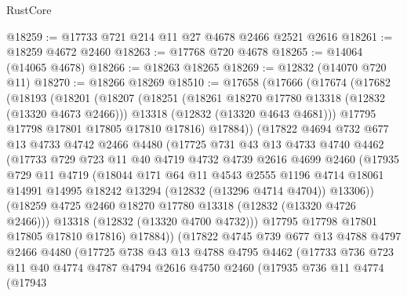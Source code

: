 \begin{lexlean}{RustCore}
\begin{coremodule}
@18259 := @17733 @721 @214 @11 @27 @4678 @2466 @2521 @2616
@18261 := @18259 @4672 @2460
@18263 := @17768 @720 @4678
@18265 := @14064 (@14065 @4678)
@18266 := @18263 @18265
@18269 := @12832 (@14070 @720 @11)
@18270 := @18266 @18269
@18510 := @17658
    (@17666
      (@17674
        (@17682
          (@18193
            (@18201
              (@18207
                (@18251
                  (@18261 @18270 @17780 @13318 (@12832 (@13320 @4673 @2466)))
                  @13318
                  (@12832 (@13320 @4643 @4681)))
                @17795
                @17798
                @17801
                @17805
                @17810
                @17816)
              @17884))
          (@17822
            @4694
            @732
            @677
            @13
            @4733
            @4742
            @2466
            @4480
            (@17725
              @731
              @43
              @13
              @4733
              @4740
              @4462
              (@17733
                @729
                @723
                @11
                @40
                @4719
                @4732
                @4739
                @2616
                @4699
                @2460
                (@17935
                  @729
                  @11
                  @4719
                  (@18044
                    @171
                    @64
                    @11
                    @4543
                    @2555
                    @1196
                    @4714
                    @18061
                    @14991
                    @14995
                    @18242
                    @13294
                    (@12832 (@13296 @4714 @4704))
                    @13306))
                (@18259 @4725 @2460 @18270 @17780 @13318 (@12832 (@13320 @4726 @2466)))
                @13318
                (@12832 (@13320 @4700 @4732)))
              @17795
              @17798
              @17801
              @17805
              @17810
              @17816)
            @17884))
        (@17822
          @4745
          @739
          @677
          @13
          @4788
          @4797
          @2466
          @4480
          (@17725
            @738
            @43
            @13
            @4788
            @4795
            @4462
            (@17733
              @736
              @723
              @11
              @40
              @4774
              @4787
              @4794
              @2616
              @4750
              @2460
              (@17935
                @736
                @11
                @4774
                (@17943

\end{coremodule}
\end{lexlean}
